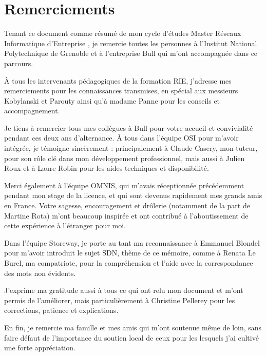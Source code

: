 \documentclass[a4paper,12pt,bibliography=totoc,index=totoc,twoside,francais]{scrbook}
\begin{document}


\frontmatter

\section*{Remerciements}

Tenant ce document comme résumé de mon cycle d'études \og Master Réseaux Informatique d'Entreprise \lg{}, je remercie toutes les personnes à l'Institut National Polytechnique de Grenoble et à l'entreprise Bull qui m'ont accompagnée dans ce parcours. 

À tous les intervenants pédagogiques de la formation RIE, j'adresse mes remerciements pour les connaissances transmises,  en spécial aux messieurs Kobylanski et Parouty ainsi qu'à madame Panne pour les conseils et accompagnement.

Je tiens à remercier tous mes collègues à Bull pour votre accueil et convivialité pendant ces deux ans d'alternance. À tous dans l'équipe OSI pour m'avoir intégrée, je témoigne sincèrement : principalement à Claude Casery, mon tuteur, pour son rôle clé dans mon développement professionnel, mais aussi à Julien Roux et à Laure Robin pour les aides techniques et disponibilité.

Merci également à l'équipe OMNIS, qui m'avais réceptionnée précédemment pendant mon stage de la licence, et qui sont devenus rapidement mes grands amis en France. Votre sagesse, encouragement et drôlerie (notamment de la part de Martine Rota) m'ont beaucoup inspirée et ont contribué à l'aboutissement de cette expérience à l'étranger pour moi. 

Dans l'équipe Storeway, je porte au tant ma reconnaissance à Emmanuel Blondel pour m'avoir introduit le sujet SDN, thème de ce mémoire, comme à Renata Le Burel, ma compatriote, pour la compréhension et l'aide avec la correspondance des mots non évidents. 

J'exprime ma gratitude aussi à tous ce qui ont relu mon document et m'ont permis de l'améliorer, mais particulièrement à Christine Pellerey pour les corrections, patience et explications.

En fin, je remercie ma famille et mes amis qui m'ont soutenue même de loin, sans faire défaut de l'importance du soutien local de ceux pour les lesquels j'ai cultivé une forte appréciation. 
\end{document}
